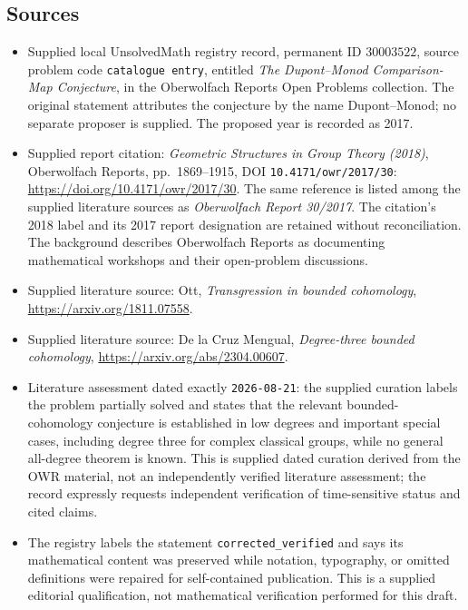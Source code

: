 \documentclass[11pt]{article}
\begin{document}
\subsection{Sources}
\begin{itemize}
\item Supplied local UnsolvedMath registry record, permanent ID \(30003522\), source problem code \texttt{catalogue entry}, entitled \emph{The Dupont--Monod Comparison-Map Conjecture}, in the Oberwolfach Reports Open Problems collection. The original statement attributes the conjecture by the name Dupont--Monod; no separate proposer is supplied. The proposed year is recorded as 2017.
\item Supplied report citation: \emph{Geometric Structures in Group Theory (2018)}, Oberwolfach Reports, pp.~1869--1915, DOI \texttt{10.4171/owr/2017/30}: \url{https://doi.org/10.4171/owr/2017/30}. The same reference is listed among the supplied literature sources as \emph{Oberwolfach Report 30/2017}. The citation's 2018 label and its 2017 report designation are retained without reconciliation. The background describes Oberwolfach Reports as documenting mathematical workshops and their open-problem discussions.
\item Supplied literature source: Ott, \emph{Transgression in bounded cohomology}, \url{https://arxiv.org/1811.07558}.
\item Supplied literature source: De la Cruz Mengual, \emph{Degree-three bounded cohomology}, \url{https://arxiv.org/abs/2304.00607}.
\item Literature assessment dated exactly \texttt{2026-08-21}: the supplied curation labels the problem partially solved and states that the relevant bounded-cohomology conjecture is established in low degrees and important special cases, including degree three for complex classical groups, while no general all-degree theorem is known. This is supplied dated curation derived from the OWR material, not an independently verified literature assessment; the record expressly requests independent verification of time-sensitive status and cited claims.
\item The registry labels the statement \texttt{corrected\_verified} and says its mathematical content was preserved while notation, typography, or omitted definitions were repaired for self-contained publication. This is a supplied editorial qualification, not mathematical verification performed for this draft.
\end{itemize}
\end{document}

